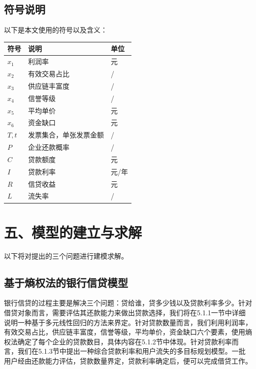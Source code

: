 \documentclass{my_paper}
\begin{document}
\subsection{符号说明}
以下是本文使用的符号以及含义：
\begin{table}[h]%
    \centering
    \begin{tabular}{p{2.0cm}<{\centering}p{9.0cm}<{\centering}p{2.0cm}<{\centering}}
    \hline
    符号 & 说明 & 单位 \\ %
    \hline
    $x_1$ & 利润率 &  元\\
    $x_2$ & 有效交易占比 &  /\\
    $x_3$ & 供应链丰富度 &  /\\
    $x_4$ & 信誉等级 &  /\\
    $x_5$ & 平均单价 &  元\\
    $x_6$ & 资金缺口 &  元\\
    $T,t$ & 发票集合，单张发票金额 &  /\\
    $P$ & 企业还款概率 &  /\\
    $C$ & 贷款额度 &  元\\
    $I$ & 贷款利率 &  元/年\\
    $R$ & 信贷收益 &  元\\
    $L$ & 流失率 &  /\\
    
    \hline
    \end{tabular}
\end{table}

\newpage
\section{五、模型的建立与求解}

以下将对提出的三个问题进行建模求解。
\subsection{基于熵权法的银行信贷模型}
银行信贷的过程主要是解决三个问题：贷给谁，贷多少钱以及贷款利率多少。针对借贷对象而言，需要评估其还款能力来做出贷款选择，我们将在5.1.1一节中详细说明一种基于多元线性回归的方法来界定。针对贷款数量而言，我们利用利润率，有效交易占比，供应链丰富度，信誉等级，平均单价，资金缺口六个要素，使用熵权法确定了每个企业的贷款数目，具体内容在5.1.2节中体现。针对贷款利率而言，我们在5.1.3节中提出一种综合贷款利率和用户流失的多目标规划模型。一批用户经由还款能力评估，贷款数量界定，贷款利率确定后，便可以完成借贷工作。
\end{document}
